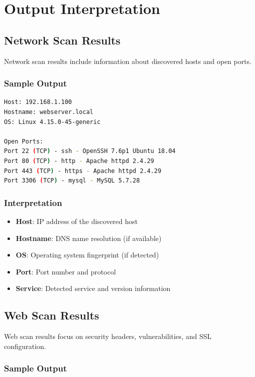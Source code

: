 \documentclass[12pt,a4paper]{report}
\begin{document}
\section{Output Interpretation}

\subsection{Network Scan Results}

Network scan results include information about discovered hosts and open ports.

\subsubsection{Sample Output}

\begin{lstlisting}[language=bash]
Host: 192.168.1.100
Hostname: webserver.local
OS: Linux 4.15.0-45-generic

Open Ports:
Port 22 (TCP) - ssh - OpenSSH 7.6p1 Ubuntu 18.04
Port 80 (TCP) - http - Apache httpd 2.4.29
Port 443 (TCP) - https - Apache httpd 2.4.29
Port 3306 (TCP) - mysql - MySQL 5.7.28
\end{lstlisting}

\subsubsection{Interpretation}

\begin{itemize}
    \item \textbf{Host}: IP address of the discovered host
    \item \textbf{Hostname}: DNS name resolution (if available)
    \item \textbf{OS}: Operating system fingerprint (if detected)
    \item \textbf{Port}: Port number and protocol
    \item \textbf{Service}: Detected service and version information
\end{itemize}

\subsection{Web Scan Results}

Web scan results focus on security headers, vulnerabilities, and SSL configuration.

\subsubsection{Sample Output}
\end{document}
